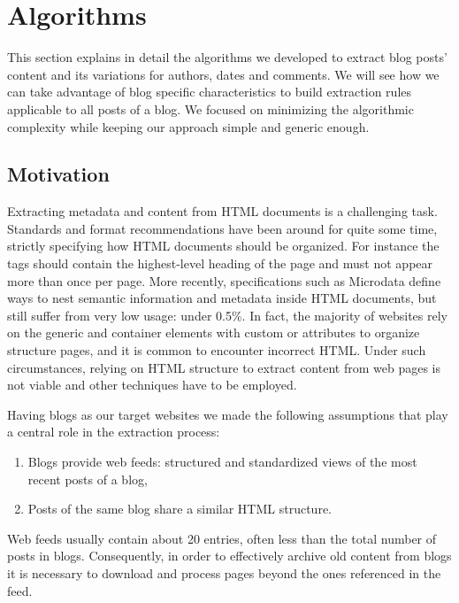 \section{Algorithms}\label{algorithms}

This section explains in detail the algorithms we developed to extract blog posts' content and its variations for authors, dates and comments. We will see how we can take advantage of blog specific characteristics to build extraction rules applicable to all posts of a blog. We focused on minimizing the algorithmic complexity while keeping our approach simple and generic enough.

\subsection{Motivation}
Extracting metadata and content from HTML documents is a challenging task. Standards and format recommendations have been around for quite some time, strictly specifying how HTML documents should be organized. For instance the  tags should contain the highest-level heading of the page and must not appear more than once per page\cite{w3c2002}. More recently, specifications such as Microdata\cite{whatwg2013} define ways to nest semantic information and metadata inside HTML documents, but still suffer from very low usage: under 0.5\%\cite{andrewrogers2013}. In fact, the majority of websites rely on the generic  and  container elements with custom  or  attributes to organize structure pages, and it is common to encounter incorrect HTML. Under such circumstances, relying on HTML structure to extract content from web pages is not viable and other techniques have to be employed.


Having blogs as our target websites we made the following assumptions that play a central role in the extraction process:
\begin{enumerate}[label={(\arabic*)}]
  \item\label{havefeedAssum} Blogs provide web feeds: structured and standardized views of the most recent posts of a blog,
  \item\label{similarhtmlAssum} Posts of the same blog share a similar HTML structure.
\end{enumerate}
Web feeds usually contain about 20 entries\cite{oita2010}, often less than the total number of posts in blogs. Consequently, in order to effectively archive old content from blogs it is necessary to download and process pages beyond the ones referenced in the feed.

